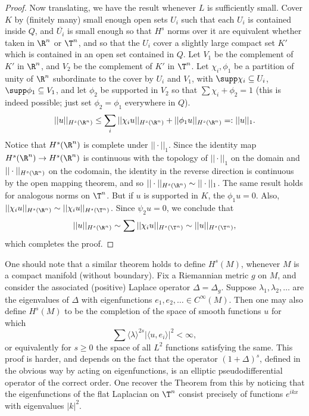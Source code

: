 \documentclass[12pt]{article}
\begin{document}
\begin{proof}
Now translating, we have the result whenever $L$ is sufficiently small. Cover $K$ by (finitely many) small enough open sets $U_i$ such that each $U_i$ is contained inside $Q$, and $\overline{U_i}$ is small enough so that $H^s$ norms over it are equivalent whether taken in $\R^n$ or $\T^n$, and so that the $U_i$ cover a slightly large compact set $K'$ which is contained in an open set contained in $Q$. Let $V_1$ be the complement of $K'$ in $\R^n$, and $V_2$ be the complement of $K'$ in $\T^n$. Let $\chi_i,\phi_1$ be a partition of unity of $\R^n$ subordinate to the cover by $U_i$ and $V_1$, with $\supp \chi_i \subseteq U_i$, $\supp \phi_1 \subseteq V_1$, and let $\phi_2$ be supported in $V_2$ so that $\sum \chi_i + \phi_2 = 1$ (this is indeed possible; just set $\phi_2 = \phi_1$ everywhere in $Q$). 
\[||u||_{H^s(\R^n)} \leq \sum_{i} ||\chi_i u||_{H^s(\R^n)} + ||\phi_1 u||_{H^s(\R^n)} =: ||u||_1.\] Notice that $H^s(\R^n)$ is complete under $||\cdot||_1$. Since the identity map $H^s(\R^n) \to H^s(\R^n)$ is continuous with the topology of $||\cdot ||_1$ on the domain and $||\cdot||_{H^s(\R^n)}$ on the codomain, the identity in the reverse direction is continuous by the open mapping theorem, and so $||\cdot||_{H^s(\R^n)} \sim ||\cdot||_1$. The same result holds for analogous norms on $\T^n$. But if $u$ is supported in $K$, the $\phi_1 u = 0$. Also, $||\chi_i u||_{H^s(\R^n)} \sim ||\chi_i u||_{H^s(\T^n)}$. Since $\psi_2 u = 0$, we conclude that
\[||u||_{H^s(\R^n)} \sim \sum ||\chi_i u||_{H^s(\T^n)} \sim ||u||_{H^s(\T^n)},\] which completes the proof.\end{proof}
One should note that a similar theorem holds to define $H^s(M)$, whenever $M$ is a compact manifold (without boundary). Fix a Riemannian metric $g$ on $M$, and consider the associated (positive) Laplace operator $\Delta = \Delta_g$.  Suppose $\lambda_1,\lambda_2,\ldots$ are the eigenvalues of $\Delta$ with eigenfunctions $e_1,e_2,\ldots \in C^\infty(M)$. Then one may also define $H^s(M)$ to be the completion of the space of smooth functions $u$ for which
\[\sum \langle \lambda \rangle^{2s}|\langle u,e_i\rangle|^2 < \infty,\] or equivalently for $s \geq 0$ the space of all $L^2$ functions satisfying the same. This proof is harder, and depends on the fact that the operator $(1+\Delta)^s$, defined in the obvious way by acting on eigenfunctions, is an elliptic pseudodifferential operator of the correct order. One recover the Theorem from this by noticing that the eigenfunctions of the flat Laplacian on $\T^n$ consist precisely of functions $e^{ikx}$ with eigenvalues $|k|^2$.
\end{document}
